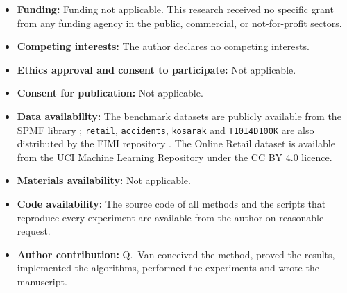 \documentclass[pdflatex,sn-mathphys,Numbered]{sn-jnl}
\theoremstyle{thmstyleone}
\theoremstyle{thmstyletwo}
\theoremstyle{thmstylethree}
\begin{document}
\begin{itemize}
\item \textbf{Funding:} Funding not applicable. This research received no specific grant from any funding agency in the public, commercial, or not-for-profit sectors.
\item \textbf{Competing interests:} The author declares no competing interests.
\item \textbf{Ethics approval and consent to participate:} Not applicable.
\item \textbf{Consent for publication:} Not applicable.
\item \textbf{Data availability:} The benchmark datasets are publicly available from the SPMF library \cite{spmfdatasets,fournier2016spmf}; \texttt{retail}, \texttt{accidents}, \texttt{kosarak} and \texttt{T10I4D100K} are also distributed by the FIMI repository \cite{goethals2004fimi,fimirepository}. The Online Retail dataset is available from the UCI Machine Learning Repository \cite{chen2015onlineretail} under the CC BY 4.0 licence.
\item \textbf{Materials availability:} Not applicable.
\item \textbf{Code availability:} The source code of all methods and the scripts that reproduce every experiment are available from the author on reasonable request.
\item \textbf{Author contribution:} Q.~Van conceived the method, proved the results, implemented the algorithms, performed the experiments and wrote the manuscript.
\end{itemize}


\end{document}
